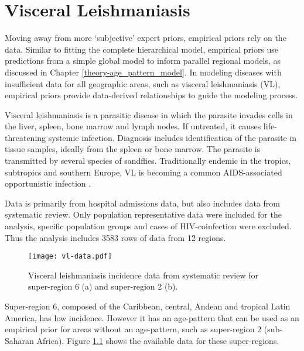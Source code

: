 \chapter{Visceral Leishmaniasis}
\label{applications-priors_empirical}

Moving away from more `subjective' expert priors, empirical priors rely on the data.  Similar to fitting the complete hierarchical model, empirical priors use predictions from a simple global model to inform parallel regional models, as discussed in Chapter \ref{theory-age_pattern_model}.  In modeling diseases with insufficient data for all geographic areas, such as visceral leishmaniasis (VL), empirical priors provide data-derived relationships to guide the modeling process.

Visceral leishmaniasis is a parasitic disease in which the parasite invades cells in the liver, spleen, bone marrow and lymph nodes.  If untreated, it causes life-threatening systemic infection.  Diagnosis includes identification of the parasite in tissue samples, ideally from the spleen or bone marrow.  The parasite is transmitted by several species of sandflies.  Traditionally  endemic in the tropics, subtropics and southern Europe, VL is becoming a common AIDS-associated opportunistic infection \cite{herwaldt_leishmaniasis_1999, zeledon_hemoflagellates_1996}.

Data is primarily from hospital admissions data, but also includes data from systematic review.  Only population representative data were included for the analysis, specific population groups and cases of HIV-coinfection were excluded.  Thus the analysis includes 3583 rows of data from 12 regions.

    \begin{figure}[h]
        \begin{center}
            \texttt{[image: vl-data.pdf]}
            \caption{Visceral leishmaniasis incidence data from systematic review for super-region 6 (a) and super-region 2 (b).}
            \label{fig:app-vl data}
        \end{center}
    \end{figure}

Super-region 6, composed of the Caribbean, central, Andean and tropical Latin America, has low incidence.  However it has an age-pattern that can be used as an empirical prior for areas without an age-pattern, such as super-region 2 (sub-Saharan Africa).  Figure \ref{fig:app-vl data} shows the available data for these super-regions.  

